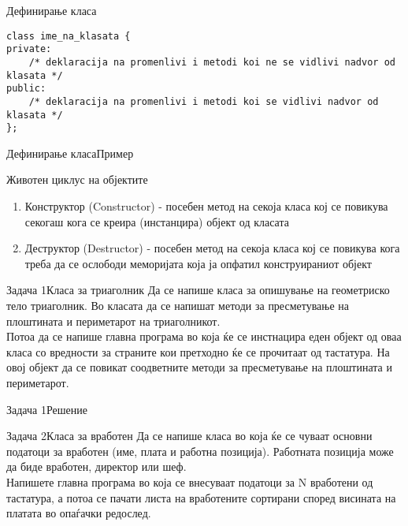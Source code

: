 
\begin{frame}[fragile,shrink=-50]{Дефинирање класа}
\begin{lstlisting}
class ime_na_klasata {
private:
    /* deklaracija na promenlivi i metodi koi ne se vidlivi nadvor od klasata */
public:
    /* deklaracija na promenlivi i metodi koi se vidlivi nadvor od klasata */
};
\end{lstlisting}
\end{frame}

\begin{frame}[fragile,shrink=10]{Дефинирање класа}{Пример}

\end{frame}

\begin{frame}{Животен циклус на објектите}
\begin{enumerate}
  \item Конструктор (Constructor) - посебен метод на секоја класа кој се
  повикува секогаш кога се креира (инстанцира) објект од класата
  \item Деструктор (Destructor) - посебен метод на секоја класа кој се
  повикува кога треба да се ослободи меморијата која ја опфатил конструираниот
  објект
\end{enumerate}
\end{frame}

\begin{frame}{Задача 1}{Класа за триаголник}
Да се напише класа за опишување на геометриско тело триаголник. Во класата да се
напишат методи за пресметување на плоштината и периметарот на триаголникот.\\
Потоа да се напише главна програма во која ќе се инстнацира еден објект од оваа
класа со вредности за страните кои претходно ќе се прочитаат од тастатура. На
овој објект да се повикат соодветните методи за пресметување на плоштината и
периметарот.
\end{frame}

\begin{frame}[fragile]{Задача 1}{Решение}

\end{frame}

\begin{frame}{Задача 2}{Класа за вработен}
Да се напише класа во која ќе се чуваат основни податоци за вработен (име,
плата и работна позиција). Работната позиција може да биде вработен, директор
или шеф.\\
Напишете главна програма во која се внесуваат податоци за N вработени од
тастатура, а потоа се пачати листа на вработените сортирани според висината на
платата во опаѓачки редослед.
\end{frame}


